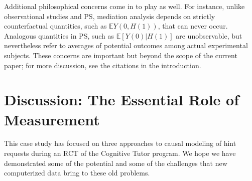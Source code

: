\documentclass{article}\usepackage[]{graphicx}\usepackage[]{color}
\newcommand{\EE}{\mathbb{E}}
\begin{document}
Additional philosophical concerns come in to play as well.
For instance, unlike observational studies and PS, mediation analysis
depends on strictly counterfactual quantities, such as $\EE Y(0,H(1))$,
that can never occur.
Analogous quantities in PS, such as $\EE [Y(0)|H(1)]$ are
unobservable, but nevertheless refer to averages of potential outcomes
among actual experimental subjects.
These concerns are important but beyond the scope of the current
paper; for more discussion, see the citations in the introduction.




\section{Discussion: The Essential Role of Measurement}\label{sec:conclusion}
This case study has focused on three approaches to causal modeling of
hint requests during an RCT of the Cognitive Tutor program.
We hope we have demonstrated some of the potential and some of the
challenges that new computerized data bring to these old problems.
\end{document}
